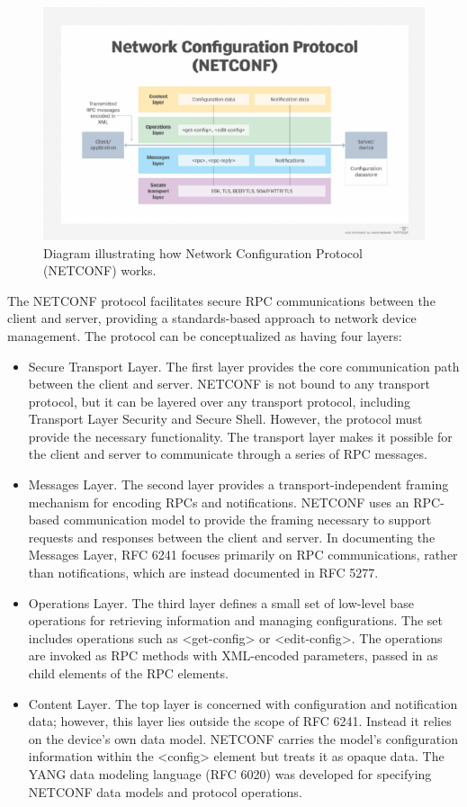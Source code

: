 \begin{figure}[!ht]
    \centering
    \includegraphics[width=\linewidth]{Images/network_configuration_protocol-f_mobile.png}
    \caption{Diagram illustrating how Network Configuration Protocol (NETCONF) works.}
    \label{fig:example}
\end{figure}

The NETCONF protocol facilitates secure RPC communications between the client and server, providing a standards-based approach to network device management. The protocol can be conceptualized as having four layers:

\begin{itemize}
    \item Secure Transport Layer. The first layer provides the core communication path between the client and server. NETCONF is not bound to any transport protocol, but it can be layered over any transport protocol, including Transport Layer Security and Secure Shell. However, the protocol must provide the necessary functionality. The transport layer makes it possible for the client and server to communicate through a series of RPC messages.
    \item Messages Layer. The second layer provides a transport-independent framing mechanism for encoding RPCs and notifications. NETCONF uses an RPC-based communication model to provide the framing necessary to support requests and responses between the client and server. In documenting the Messages Layer, RFC 6241 focuses primarily on RPC communications, rather than notifications, which are instead documented in RFC 5277.
    \item Operations Layer. The third layer defines a small set of low-level base operations for retrieving information and managing configurations. The set includes operations such as <get-config> or <edit-config>. The operations are invoked as RPC methods with XML-encoded parameters, passed in as child elements of the RPC elements.
    \item Content Layer. The top layer is concerned with configuration and notification data; however, this layer lies outside the scope of RFC 6241. Instead it relies on the device's own data model. NETCONF carries the model's configuration information within the <config> element but treats it as opaque data. The YANG data modeling language (RFC 6020) was developed for specifying NETCONF data models and protocol operations.
\end{itemize}

